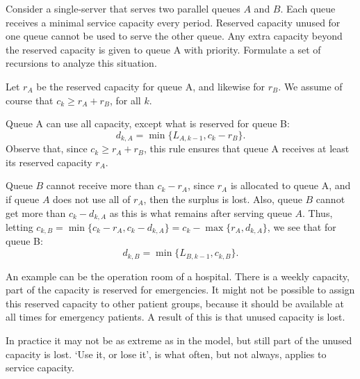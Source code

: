 \begin{exercise}  Consider a
  single-server that serves two parallel queues $A$ and $B$. Each queue receives a
  minimal service capacity every period. Reserved capacity unused for
  one queue cannot be used to serve the other queue. Any extra
  capacity beyond the reserved capacity is given to queue A with
  priority. Formulate a set of recursions to analyze this situation.

  Let $r_A$ be the reserved capacity for queue A, and likewise for
   $r_B$. We assume of course that $c_k\geq r_A + r_B$, for all $k$.
\begin{solution} Queue A can use all capacity, except what is
     reserved for queue B:
\begin{equation*}
  d_{k,A} = \min\{L_{A, k-1}, c_k - r_B\}.
\end{equation*}
Observe that, since $c_k \geq r_A + r_B$, this rule ensures that queue
A receives at least its reserved capacity $r_A$.

Queue $B$ cannot receive more than $c_k-r_A$, since $r_A$ is allocated
to queue A, and if queue $A$ does not use all of $r_A$, then the
surplus is lost. Also, queue $B$ cannot get more than $c_k - d_{k,A}$
as this is what remains after serving queue $A$. Thus, letting
$c_{k,B} = \min\{c_k-r_A, c_k-d_{k,A}\} = c_k - \max\{r_A, d_{k,A}\}$,
we see that for queue B:
\begin{equation*}
  d_{k,B} = \min\{L_{B, k-1}, c_{k,B}\}.
\end{equation*}

An example can be the operation room of a hospital.
There is a weekly capacity, part of the capacity is reserved for emergencies.
It might not be possible to assign this reserved capacity to other patient groups, because it should be available at all times for emergency patients.
A result of this is that unused capacity is lost.

In practice it may not be as extreme as in the model, but still part
of the unused capacity is lost. `Use it, or lose it', is what often,
but not always, applies to service capacity.
\end{solution}
\end{exercise}




